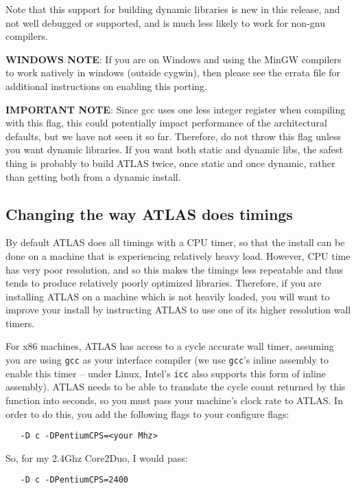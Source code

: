 \documentclass[11pt]{article}
\begin{document}
Note that this support for building dynamic libraries is new in this release,
and not well debugged or supported, and is much less likely to work for
non-gnu compilers.

\textbf{WINDOWS NOTE}: If you are on Windows and using the MinGW compilers
to work natively in windows (outside cygwin), then please see the errata
file for additional instructions on enabling this porting.

\textbf{IMPORTANT NOTE}: Since gcc uses one less integer register when
      compiling with this flag, this
      could potentially impact performance of the architectural defaults,
      but we have not seen it so far.  Therefore, do not throw this flag
      unless you want dynamic libraries.  If you want both static and dynamic
      libs, the safest thing is probably to build ATLAS twice, once static
      and once dynamic, rather than getting both from a dynamic install.


\subsection{Changing the way ATLAS does timings}
\label{sec-time-flags}

By default ATLAS does all timings with a CPU timer, so that the install
can be done on a machine that is experiencing relatively heavy load.  However,
CPU time has very poor resolution, and so this makes the timings less repeatable
and thus tends to produce relatively poorly optimized libraries.
Therefore, if
you are installing ATLAS on a machine which is not heavily loaded, you will
want to improve your install by instructing ATLAS to use one of its higher
resolution wall timers.

For x86 machines, ATLAS has access to a cycle accurate wall timer, assuming
you are using {\tt gcc} as your interface compiler (we use {\tt gcc}'s inline
assembly to enable this timer -- under Linux, Intel's {\tt icc} also supports
this form of inline
assembly).  ATLAS needs to be able to translate the cycle count returned by
this function into seconds, so you must pass your machine's clock rate to
ATLAS.  In order to do this, you add the following flags to your 
configure flags:
\vspace*{-0.1in}
\begin{verbatim}
   -D c -DPentiumCPS=<your Mhz>
\end{verbatim}
So, for my 2.4Ghz Core2Duo, I would pass:
\vspace*{-0.1in}
\begin{verbatim}
   -D c -DPentiumCPS=2400
\end{verbatim}
\end{document}

